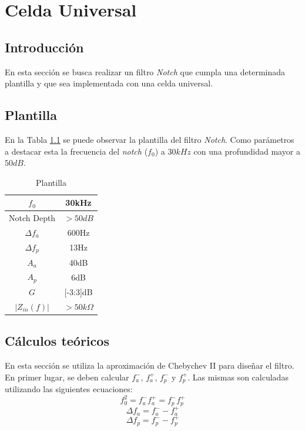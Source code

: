 \chapter{Celda Universal}
\section{Introducción}
En esta sección se busca realizar un filtro \textit{Notch} que cumpla una determinada plantilla y que sea implementada con una celda universal. 

\section{Plantilla}

En la Tabla \ref{tab:ej4_plantilla} se puede observar la plantilla del filtro \textit{Notch}. Como parámetros a destacar esta la frecuencia del \textit{notch} ($f_0$) a $30kHz$ con una profundidad mayor a $50 dB$.

\begin{table}[h!]
    \centering
    \begin{tabular}{|c|c|}
    \hline
    $f_0$                      & 30kHz                             \\ \hline
    Notch Depth                        & $> 50 dB$                           \\ \hline
    $\Delta f_a$                       & 600Hz                             \\ \hline
    $\Delta f_p$                        & 13Hz                              \\ \hline
    $A_a$                              & 40dB                              \\ \hline
    $A_p$                              & 6dB                               \\ \hline
    $G$                              & [-3:3]dB                               \\ \hline
    $|Z_{in}(f)|$                    & $>50k\Omega$                               \\ \hline
  
    \end{tabular}
    \caption{Plantilla}
    \label{tab:ej4_plantilla}
    \end{table}


\section{Cálculos teóricos}
En esta sección se utiliza la aproximación de Chebychev II para diseñar el filtro. En primer lugar, se deben calcular $f^-_a$, $f^+_a$, $f^-_p$ y $f^+_p$. Las mismas son calculadas utilizando las siguientes ecuaciones:
\begin{displaymath}  f^2_0 = f^-_a f^+_a = f^-_p f^+_p \end{displaymath} 
\begin{displaymath}  \Delta f_a = f^-_a - f^+_a \end{displaymath}     
\begin{displaymath}  \Delta f_ p= f^-_p - f^+_p \end{displaymath} 


